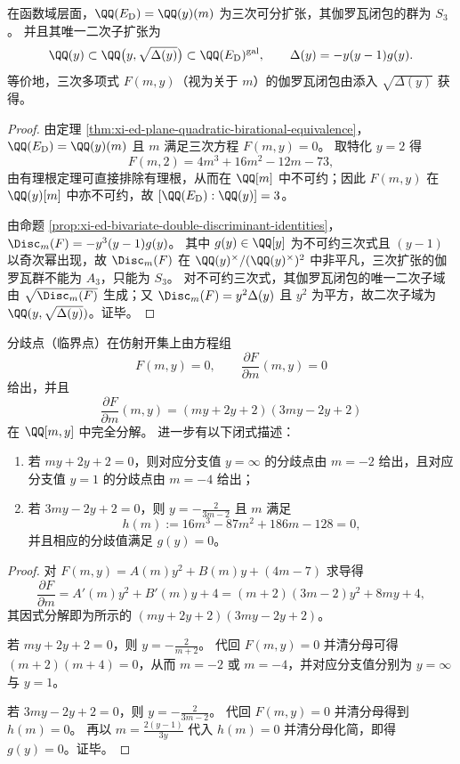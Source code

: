 \begin{corollary}\label{cor:xi-ed-functionfield-s3-structure-and-quadratic-resolvent}
在函数域层面，\(\QQ(E_{\mathrm D})=\QQ(y)(m)\) 为三次可分扩张，其伽罗瓦闭包的群为 \(S_3\)。
并且其唯一二次子扩张为
\[
\QQ(y)\subset \QQ\bigl(y,\sqrt{\Delta(y)}\bigr)\subset \QQ(E_{\mathrm D})^{\mathrm{gal}},
\qquad
\Delta(y)=-y(y-1)g(y).
\]
等价地，三次多项式 \(F(m,y)\)（视为关于 \(m\)）的伽罗瓦闭包由添入 \(\sqrt{\Delta(y)}\) 获得。
\end{corollary}
\begin{proof}
由定理 \ref{thm:xi-ed-plane-quadratic-birational-equivalence}，\(\QQ(E_{\mathrm D})=\QQ(y)(m)\) 且 \(m\) 满足三次方程 \(F(m,y)=0\)。
取特化 \(y=2\) 得
\[
F(m,2)=4m^3+16m^2-12m-73,
\]
由有理根定理可直接排除有理根，从而在 \(\QQ[m]\) 中不可约；因此 \(F(m,y)\) 在 \(\QQ(y)[m]\) 中亦不可约，故 \([\QQ(E_{\mathrm D}):\QQ(y)]=3\)。
\par
由命题 \ref{prop:xi-ed-bivariate-double-discriminant-identities}，\(\Disc_m(F)=-y^3(y-1)g(y)\)。
其中 \(g(y)\in\QQ[y]\) 为不可约三次式且 \((y-1)\) 以奇次幂出现，故 \(\Disc_m(F)\) 在 \(\QQ(y)^\times/(\QQ(y)^\times)^2\) 中非平凡，三次扩张的伽罗瓦群不能为 \(A_3\)，只能为 \(S_3\)。
对不可约三次式，其伽罗瓦闭包的唯一二次子域由 \(\sqrt{\Disc_m(F)}\) 生成；又 \(\Disc_m(F)=y^2\Delta(y)\) 且 \(y^2\) 为平方，故二次子域为 \(\QQ(y,\sqrt{\Delta(y)})\)。证毕。
\end{proof}

\begin{proposition}\label{prop:xi-ed-Fm-complete-factorization-and-branchpoints}
分歧点（临界点）在仿射开集上由方程组
\[
F(m,y)=0,\qquad \frac{\partial F}{\partial m}(m,y)=0
\]
给出，并且
\[
\frac{\partial F}{\partial m}(m,y)=(my+2y+2)(3my-2y+2)
\]
在 \(\QQ[m,y]\) 中完全分解。
进一步有以下闭式描述：
\begin{enumerate}
  \item 若 \(my+2y+2=0\)，则对应分支值 \(y=\infty\) 的分歧点由 \(m=-2\) 给出，且对应分支值 \(y=1\) 的分歧点由 \(m=-4\) 给出；
  \item 若 \(3my-2y+2=0\)，则 \(y=-\frac{2}{3m-2}\) 且 \(m\) 满足
  \[
  h(m):=16m^3-87m^2+186m-128=0,
  \]
  并且相应的分歧值满足 \(g(y)=0\)。
\end{enumerate}
\end{proposition}
\begin{proof}
对 \(F(m,y)=A(m)y^2+B(m)y+(4m-7)\) 求导得
\[
\frac{\partial F}{\partial m}
=A'(m)y^2+B'(m)y+4
=(m+2)(3m-2)y^2+8my+4,
\]
其因式分解即为所示的 \((my+2y+2)(3my-2y+2)\)。
\par
若 \(my+2y+2=0\)，则 \(y=-\frac{2}{m+2}\)。
代回 \(F(m,y)=0\) 并清分母可得 \((m+2)(m+4)=0\)，从而 \(m=-2\) 或 \(m=-4\)，并对应分支值分别为 \(y=\infty\) 与 \(y=1\)。
\par
若 \(3my-2y+2=0\)，则 \(y=-\frac{2}{3m-2}\)。
代回 \(F(m,y)=0\) 并清分母得到 \(h(m)=0\)。
再以 \(m=\frac{2(y-1)}{3y}\) 代入 \(h(m)=0\) 并清分母化简，即得 \(g(y)=0\)。证毕。
\end{proof}

